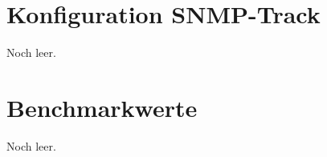 \chapter{Konfiguration SNMP-Track}
\label{cha:Anhang1}

Noch leer.

\chapter{Benchmarkwerte}
\label{cha:Anhang2}

Noch leer.